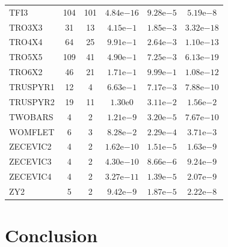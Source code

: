 \documentclass[11pt]{article}
\begin{document}
\begin{center}
\begin{longtable}{lccccc}
TFI3 & 104 & 101 & $4.84\mathrm{e}{-16}$ & $9.28\mathrm{e}{-5}$ & $5.19\mathrm{e}{-8}$ \\
TRO3X3 & 31 & 13 & $4.15\mathrm{e}{-1}$ & $1.85\mathrm{e}{-3}$ & $3.32\mathrm{e}{-18}$ \\
TRO4X4 & 64 & 25 & $9.91\mathrm{e}{-1}$ & $2.64\mathrm{e}{-3}$ & $1.10\mathrm{e}{-13}$ \\
TRO5X5 & 109 & 41 & $4.90\mathrm{e}{-1}$ & $7.25\mathrm{e}{-3}$ & $6.13\mathrm{e}{-19}$ \\
TRO6X2 & 46 & 21 & $1.71\mathrm{e}{-1}$ & $9.99\mathrm{e}{-1}$ & $1.08\mathrm{e}{-12}$ \\
TRUSPYR1 & 12 & 4 & $6.63\mathrm{e}{-1}$ & $7.17\mathrm{e}{-3}$ & $7.88\mathrm{e}{-10}$ \\
TRUSPYR2 & 19 & 11 & $1.30\mathrm{e}{0}$ & $3.11\mathrm{e}{-2}$ & $1.56\mathrm{e}{-2}$ \\
TWOBARS & 4 & 2 & $1.21\mathrm{e}{-9}$ & $3.20\mathrm{e}{-5}$ & $7.67\mathrm{e}{-10}$ \\
WOMFLET & 6 & 3 & $8.28\mathrm{e}{-2}$ & $2.29\mathrm{e}{-4}$ & $3.71\mathrm{e}{-3}$ \\
ZECEVIC2 & 4 & 2 & $1.62\mathrm{e}{-10}$ & $1.51\mathrm{e}{-5}$ & $1.63\mathrm{e}{-9}$ \\
ZECEVIC3 & 4 & 2 & $4.30\mathrm{e}{-10}$ & $8.66\mathrm{e}{-6}$ & $9.24\mathrm{e}{-9}$ \\
ZECEVIC4 & 4 & 2 & $3.27\mathrm{e}{-11}$ & $1.39\mathrm{e}{-5}$ & $2.07\mathrm{e}{-9}$ \\
ZY2 & 5 & 2 & $9.42\mathrm{e}{-9}$ & $1.87\mathrm{e}{-5}$ & $2.22\mathrm{e}{-8}$ \\
\bottomrule
\end{longtable}
\end{center}



\section{Conclusion}\label{sec:summary}
\end{document}
